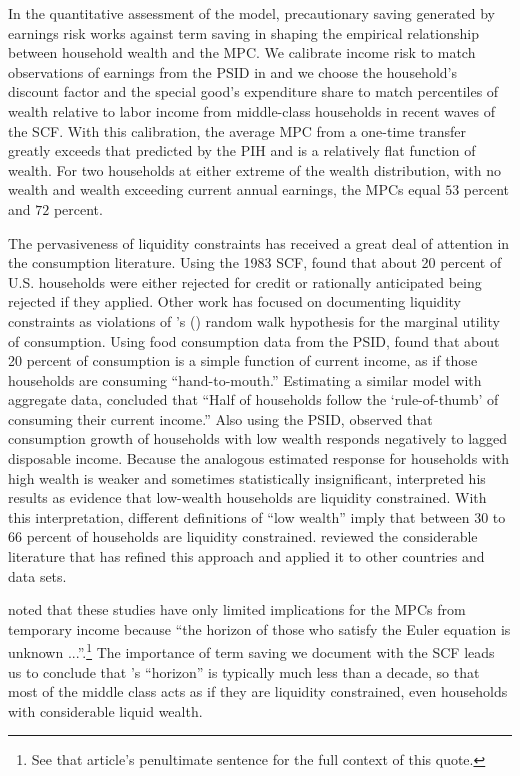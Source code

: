 \documentclass[fleqccn,12pt]{article}
\newcommand{\cites}[1]{\citeauthor{#1}'s (\citeyear{#1})}
\begin{document}
In the quantitative assessment of the model, precautionary saving generated by earnings risk works against term saving in shaping the empirical relationship between household wealth and the MPC. We calibrate income risk to match observations of earnings from the PSID in \cite{ecta2004MeghirPistaferri} and we choose the household's discount factor and the special good's expenditure share to match percentiles of wealth relative to labor income from middle-class households in recent waves of the SCF.  With this calibration, the average MPC from a one-time transfer greatly exceeds that predicted by the PIH and is a relatively flat function of wealth. For two households at either extreme of the wealth distribution, with no wealth and wealth exceeding current annual earnings, the MPCs equal $53$ percent and $72$ percent. 

The pervasiveness of liquidity constraints has received a great deal of attention in the consumption literature. Using the 1983 SCF, \cite{qje1990Jappelli} found that about 20 percent of U.S. households were either rejected for credit or rationally anticipated being rejected if they applied. Other work has focused on documenting liquidity constraints as violations of \cites{jpe1978Hall} random walk hypothesis for the marginal utility of consumption. Using food consumption data from the PSID, \cite{econometrica1982HallMishkin} found that about 20 percent of consumption is a simple function of current income, as if those households are consuming ``hand-to-mouth.'' Estimating a similar model with aggregate data, \cite{nber1989CampbellMankiw} concluded that ``Half of households follow the `rule-of-thumb' of consuming their current income.'' Also using the PSID, \cite{jpe1989Zeldes} observed that consumption growth of households with low wealth responds negatively to lagged disposable income. Because the analogous estimated response for households with high wealth is weaker and sometimes statistically insignificant, \citeauthor{jpe1989Zeldes} interpreted his results as evidence that low-wealth households are liquidity constrained. With this interpretation, different definitions of ``low wealth'' imply that between 30 to 66 percent of households are liquidity constrained. \cite{annualReview2010JappelliPistaferri} reviewed the considerable literature that has refined this approach and applied it to other countries and data sets. 

\cite{worldCongress1987Hayashi} noted that these studies have only limited implications for the MPCs from temporary income because ``the horizon of those who satisfy the Euler equation is unknown ...''.\footnote{See that article's penultimate sentence for the full context of this quote.} The importance of term saving we document with the SCF leads us to conclude that \citeauthor{worldCongress1987Hayashi}'s ``horizon'' is typically much less than a decade, so that most of the middle class acts as if they are liquidity constrained, even households with considerable liquid wealth. 
\end{document}

